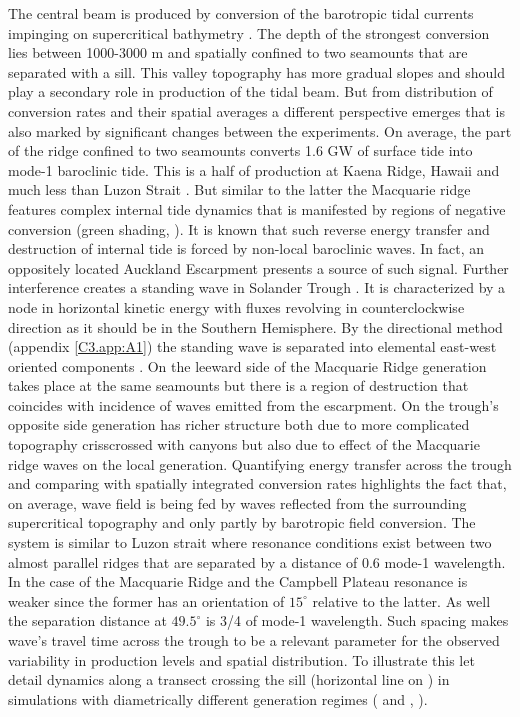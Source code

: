 \documentclass[12pt]{article}
\begin{document}
The central beam is produced by conversion of the barotropic tidal currents impinging on 
supercritical bathymetry . The depth of the strongest conversion lies between 
1000-3000 m and spatially 
confined 
to two seamounts that are separated with a sill. This valley topography has more gradual slopes and 
should play 
a secondary role in production of the tidal beam. But from distribution of conversion rates 
 and their spatial averages  a different perspective 
emerges that is also marked by significant changes between the experiments. On average, 
the part of the ridge confined to two seamounts converts 1.6 GW of surface tide into mode-1 
baroclinic tide. This is a half of production at Kaena Ridge, 
Hawaii 
\citep{carter2008energetics} and much less than Luzon Strait \citep{}. But similar to the latter 
the Macquarie ridge features complex internal tide dynamics that is manifested by regions of 
negative conversion (green shading, ). It is known \citep{Kelly2010a} 
that such reverse energy transfer and destruction of internal tide is forced by non-local 
baroclinic 
waves. In fact, an oppositely located Auckland Escarpment presents a source of such signal. Further 
interference creates a standing wave in Solander Trough . It is 
characterized by a node in horizontal kinetic energy with fluxes revolving in counterclockwise 
direction  as it should be in the Southern Hemisphere. By the directional 
method (appendix \ref{C3.app:A1}) the standing wave is separated into elemental east-west oriented 
components . On the leeward side of the Macquarie Ridge generation 
takes place at the same seamounts but there is a region of destruction that coincides with 
incidence of waves emitted from the escarpment. On the trough's opposite side generation has 
richer structure both due to more complicated topography crisscrossed with canyons but also due to 
effect of the Macquarie ridge waves on the local generation. Quantifying energy transfer across the 
trough 
and comparing with spatially integrated conversion rates  highlights 
the fact that, on average, wave field is 
being fed by waves reflected from the surrounding supercritical topography and only partly by 
barotropic field conversion. The 
system is similar to Luzon strait where resonance conditions exist between two almost parallel 
ridges \citep{buijsman2014three} that are separated by a distance of 0.6 mode-1 wavelength. In 
the case of the Macquarie Ridge and the Campbell Plateau resonance is weaker since the former 
has an orientation of $15^{\circ}$ relative to the latter. As well the separation distance at 
$49.5^{\circ}$ is 3/4 of mode-1 wavelength. Such spacing makes wave's travel time across the 
trough to be a relevant parameter for the observed variability in production levels and spatial 
distribution. To illustrate this let detail dynamics along a transect crossing the sill 
(horizontal line on ) in simulations with diametrically different generation 
regimes ( and , ).\\
\end{document}
